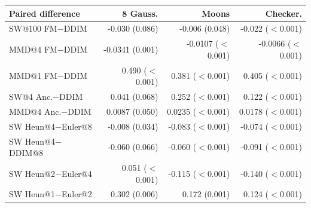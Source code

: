 \begin{tabular}{lrrr}
\toprule
Paired difference & 8 Gauss. & Moons & Checker. \\
\midrule
SW@100 FM$-$DDIM & -0.030 (0.086) & -0.006 (0.048) & -0.022 ($<$0.001) \\
MMD@4 FM$-$DDIM & -0.0341 (0.001) & -0.0107 ($<$0.001) & -0.0066 ($<$0.001) \\
MMD@1 FM$-$DDIM & 0.490 ($<$0.001) & 0.381 ($<$0.001) & 0.405 ($<$0.001) \\
SW@4 Anc.$-$DDIM & 0.041 (0.068) & 0.252 ($<$0.001) & 0.122 ($<$0.001) \\
MMD@4 Anc.$-$DDIM & 0.0087 (0.050) & 0.0235 ($<$0.001) & 0.0178 ($<$0.001) \\
SW Heun@4$-$Euler@8 & -0.008 (0.034) & -0.083 ($<$0.001) & -0.074 ($<$0.001) \\
SW Heun@4$-$DDIM@8 & -0.060 (0.066) & -0.060 ($<$0.001) & -0.091 ($<$0.001) \\
SW Heun@2$-$Euler@4 & 0.051 ($<$0.001) & -0.115 ($<$0.001) & -0.140 ($<$0.001) \\
SW Heun@1$-$Euler@2 & 0.302 (0.006) & 0.172 (0.001) & 0.124 ($<$0.001) \\
\bottomrule
\end{tabular}

